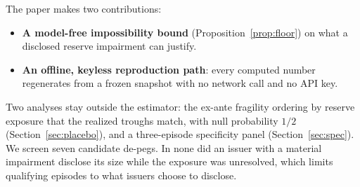 The paper makes two contributions:
\begin{itemize}
\item \textbf{A model-free impossibility bound} (Proposition~\ref{prop:floor}) on what a
  disclosed reserve impairment can justify.
\item \textbf{An offline, keyless reproduction path}: every computed number regenerates
  from a frozen snapshot with no network call and no API key.
\end{itemize}
Two analyses stay outside the estimator: the ex-ante fragility
ordering by reserve exposure that the realized troughs match, with null probability $1/2$
(Section~\ref{sec:placebo}), and a three-episode specificity panel
(Section~\ref{sec:spec}). We screen seven candidate de-pegs. In none did an issuer with
a material impairment disclose its size while the exposure was unresolved, which limits
qualifying episodes to what issuers choose to disclose.
